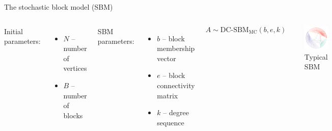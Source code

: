 \documentclass{beamer}
\begin{document}
	\begin{frame}{The stochastic block model (SBM)}
		\begin{columns}
			Initial parameters:
			\begin{itemize}
				\item $N$ -- number of vertices
				\item $B$ -- number of blocks
			\end{itemize}
			\vspace{1em}
			SBM parameters:
			\begin{itemize}
				\item $b$ -- block membership vector
				\item $e$ -- block connectivity matrix
				\item $k$ -- degree sequence
			\end{itemize}
			
			\begin{equation}
				A \sim \textrm{DC-SBM}_{\textrm{MC}}(b, e, k)
			\end{equation}
			
			
			\begin{figure}
				\includegraphics[width=0.8\linewidth]{polbooks-graph}
				\caption{Typical SBM}
			\end{figure}
		\end{columns}
	\end{frame}
\end{document}
